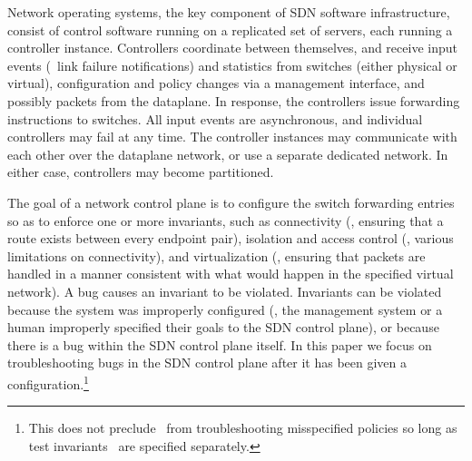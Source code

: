 %
Network operating systems, the key component of SDN software
infrastructure, consist of control software running on a replicated set of
servers, each running a controller instance. Controllers coordinate between
themselves, and receive input events (\eg~link failure notifications) and
statistics from switches (either physical or virtual), configuration and
policy changes via a management interface, and possibly packets from the dataplane.
In response, the
controllers issue forwarding instructions to switches. All input
events are asynchronous, and individual controllers may fail at any
time. The controller instances may communicate
with each other over the dataplane network, or use a separate dedicated
network. In either case, controllers may become partitioned.

The goal of a network control plane is to configure the switch forwarding entries so as to
enforce one or more invariants, such as connectivity (\ie, ensuring that a
route exists between every endpoint pair), isolation and access control (\ie, various limitations on
connectivity), and virtualization (\ie, ensuring that packets are handled
in a manner consistent with what would happen in the specified virtual
network). A bug causes an invariant to be violated. Invariants can be
violated because the system was improperly configured
(\eg, the management system \cite{quantum} or a human improperly specified their goals to the SDN control plane), or
because there is a bug within the SDN control plane itself. In this paper we focus on troubleshooting bugs in the
SDN control plane after it has been given a configuration.\footnote{This does
not preclude \projectname~from troubleshooting misspecified policies so long as
test invariants~\cite{hsa} are specified separately.}

